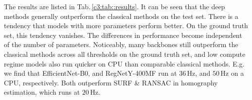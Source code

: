 


The results are listed in Tab.\,\ref{c3:tab::results}. It can be seen that the deep methods generally outperform the classical methods on the test set. There is a tendency that models with more parameters perform better. On the ground truth set, this tendency vanishes. The differences in performance become independent of the number of parameters. Noticeably, many backbones still outperform the classical methods across all thresholds on the ground truth set, and low compute regime models also run quicker on CPU than comparable classical methods. E.g. we find that EfficientNet-B0, and RegNetY-400MF run at $36\,\text{Hz}$, and $50\,\text{Hz}$ on a CPU, respectively. Both outperform SURF \& RANSAC in homography estimation, which runs at $20\,\text{Hz}$.



